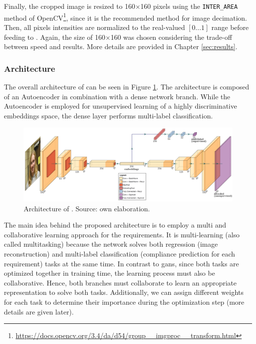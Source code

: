 Finally, the cropped image is resized to 160$\times$160 pixels using the \texttt{INTER\_AREA} method of OpenCV\footnote{\url{https://docs.opencv.org/3.4/da/d54/group__imgproc__transform.html}}, since it is the recommended method for image decimation. Then, all pixels intensities are normalized to the real-valued $[0...1]$ range before feeding to \methodname. Again, the size of 160$\times$160 was chosen considering the trade-off between speed and results. More details are provided in Chapter \ref{sec:results}. 

\subsubsection{Architecture}

The overall architecture of \methodname can be seen in Figure \ref{fig:icaonet}. The architecture is composed of an Autoencoder in combination with a dense network branch. While the Autoencoder is employed for unsupervised learning of a highly discriminative embeddings space, the dense layer performs multi-label classification. 

\begin{figure}
\centering
\includegraphics[width=\linewidth]{images/icaonet.pdf}
\caption{Architecture of \methodname. Source: own elaboration.}
\label{fig:icaonet}
\end{figure}

The main idea behind the proposed architecture is to employ a multi and collaborative learning approach for the \icao requirements. It is multi-learning (also called multitasking) because the network solves both regression (image reconstruction) and multi-label classification (compliance prediction for each requirement) tasks at the same time. In contrast to \acfp{gan}, since both tasks are optimized together in training time, the learning process must also be collaborative. Hence, both branches must collaborate to learn an appropriate representation to solve both tasks. Additionally, we can assign different weights for each task to determine their importance during the optimization step (more details are given later).

